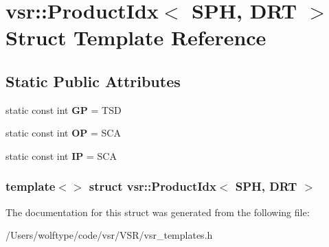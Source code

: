\hypertarget{structvsr_1_1_product_idx_3_01_s_p_h_00_01_d_r_t_01_4}{\section{vsr\-:\-:Product\-Idx$<$ S\-P\-H, D\-R\-T $>$ Struct Template Reference}
\label{structvsr_1_1_product_idx_3_01_s_p_h_00_01_d_r_t_01_4}
}
\subsection*{Static Public Attributes}
\begin{DoxyCompactItemize}
\item 
\hypertarget{structvsr_1_1_product_idx_3_01_s_p_h_00_01_d_r_t_01_4_a76121c69d4d132f884262f68ebf4a00c}{static const int {\bfseries G\-P} = T\-S\-D}\label{structvsr_1_1_product_idx_3_01_s_p_h_00_01_d_r_t_01_4_a76121c69d4d132f884262f68ebf4a00c}

\item 
\hypertarget{structvsr_1_1_product_idx_3_01_s_p_h_00_01_d_r_t_01_4_a0e321c6e9c08f2c9488ca7efd7316cf7}{static const int {\bfseries O\-P} = S\-C\-A}\label{structvsr_1_1_product_idx_3_01_s_p_h_00_01_d_r_t_01_4_a0e321c6e9c08f2c9488ca7efd7316cf7}

\item 
\hypertarget{structvsr_1_1_product_idx_3_01_s_p_h_00_01_d_r_t_01_4_a5f69ba2b913d109ff8ab3bc1ef6677a6}{static const int {\bfseries I\-P} = S\-C\-A}\label{structvsr_1_1_product_idx_3_01_s_p_h_00_01_d_r_t_01_4_a5f69ba2b913d109ff8ab3bc1ef6677a6}

\end{DoxyCompactItemize}
\subsubsection*{template$<$$>$ struct vsr\-::\-Product\-Idx$<$ S\-P\-H, D\-R\-T $>$}



The documentation for this struct was generated from the following file\-:\begin{DoxyCompactItemize}
\item 
/\-Users/wolftype/code/vsr/\-V\-S\-R/vsr\-\_\-templates.\-h\end{DoxyCompactItemize}
